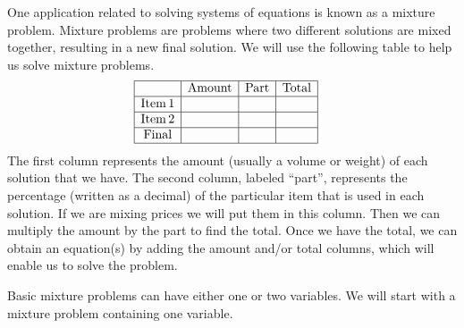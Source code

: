 One application related to solving systems of equations is known as a mixture problem. Mixture problems
are problems where two different solutions are mixed together, resulting in a new
final solution. We will use the following table to help us solve mixture
problems.
\begin{eqnarray*}
  \begin{array}{|c|c|c|c|}
    \hline
    & \operatorname{Amount} & \operatorname{Part} & \operatorname{Total}\\
    \hline
    \operatorname{Item} 1 &  &  & \\
    \hline
    \operatorname{Item} 2 &  &  & \\
    \hline
    \operatorname{Final} &  &  & \\
    \hline
  \end{array} &  & 
\end{eqnarray*}
The first column represents the amount (usually a volume or weight) of each solution that we have. The second column, labeled ``part'', represents the percentage (written as a decimal) of the particular item that is used in each solution. If we are mixing prices we will put them in this column.
Then we can multiply the amount by the part to find the total. Once we have the total, we can obtain
an equation(s) by adding the amount and/or total columns, which will enable us to solve
the problem.\pp

Basic mixture problems can have either one or two variables. We will start with a mixture problem containing one variable.

